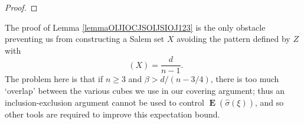 \documentclass[dvipsnames,letterpaper,12pt]{article}
\numberwithin{equation}{section}
\DeclareMathOperator{\fordim}{\dim_{\mathbf{F}}}
\DeclareMathOperator{\ZZ}{\mathbf{Z}}
\DeclareMathOperator{\TT}{\mathbf{T}}
\numberwithin{theorem}{section}
\DeclareMathOperator{\EE}{\mathbf{E}}
\begin{document}
\begin{proof}
\end{proof}

The proof of Lemma \ref{lemmaOIJIOCJSOIJSIOJ123} is the only obstacle preventing us from constructing a Salem set $X$ avoiding the pattern defined by $Z$ with
%
\[ \fordim(X) = \frac{d}{n-1}. \]
%
The problem here is that if $n \geq 3$ and $\beta > d/(n-3/4)$, there is too much `overlap' between the various cubes we use in our covering argument; thus an inclusion-exclusion argument cannot be used to control $\EE(\widehat{\sigma}(\xi))$, and so other tools are required to improve this expectation bound.
\end{document}

